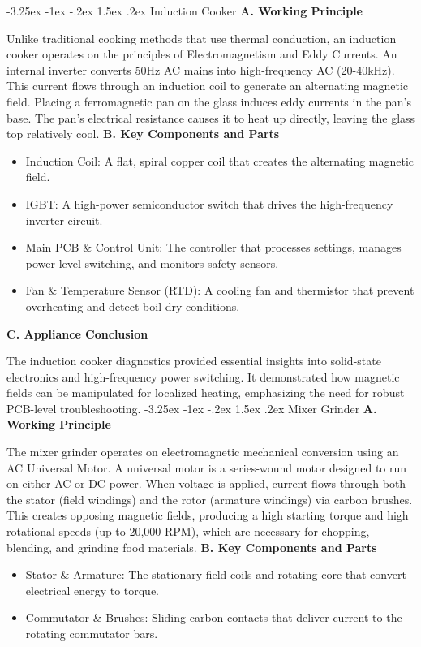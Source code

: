 \documentclass[11pt,a4paper]{report}
\makeatletter
\renewcommand{\section}{\@startsection{section}{1}{\z@}%
  {-3.25ex \@plus -1ex \@minus -.2ex}%
  {1.5ex \@plus.2ex}%
  {\normalfont\Large\bfseries\color{primaryColor}}}
\makeatother
\begin{document}
\section{Induction Cooker}
\noindent\textbf{A. Working Principle}\par\medskip
Unlike traditional cooking methods that use thermal conduction, an induction cooker operates on the principles of Electromagnetism and Eddy Currents. An internal inverter converts 50Hz AC mains into high-frequency AC (20-40kHz). This current flows through an induction coil to generate an alternating magnetic field. Placing a ferromagnetic pan on the glass induces eddy currents in the pan's base. The pan's electrical resistance causes it to heat up directly, leaving the glass top relatively cool.
\noindent\textbf{B. Key Components and Parts}\par\medskip
\begin{itemize}
  \item Induction Coil: A flat, spiral copper coil that creates the alternating magnetic field.
  \item IGBT: A high-power semiconductor switch that drives the high-frequency inverter circuit.
  \item Main PCB \& Control Unit: The controller that processes settings, manages power level switching, and monitors safety sensors.
  \item Fan \& Temperature Sensor (RTD): A cooling fan and thermistor that prevent overheating and detect boil-dry conditions.
\end{itemize}
\noindent\textbf{C. Appliance Conclusion}\par\medskip
The induction cooker diagnostics provided essential insights into solid-state electronics and high-frequency power switching. It demonstrated how magnetic fields can be manipulated for localized heating, emphasizing the need for robust PCB-level troubleshooting.
\section{Mixer Grinder}
\noindent\textbf{A. Working Principle}\par\medskip
The mixer grinder operates on electromagnetic mechanical conversion using an AC Universal Motor. A universal motor is a series-wound motor designed to run on either AC or DC power. When voltage is applied, current flows through both the stator (field windings) and the rotor (armature windings) via carbon brushes. This creates opposing magnetic fields, producing a high starting torque and high rotational speeds (up to 20,000 RPM), which are necessary for chopping, blending, and grinding food materials.
\noindent\textbf{B. Key Components and Parts}\par\medskip
\begin{itemize}
  \item Stator \& Armature: The stationary field coils and rotating core that convert electrical energy to torque.
  \item Commutator \& Brushes: Sliding carbon contacts that deliver current to the rotating commutator bars.
\end{itemize}
\end{document}
